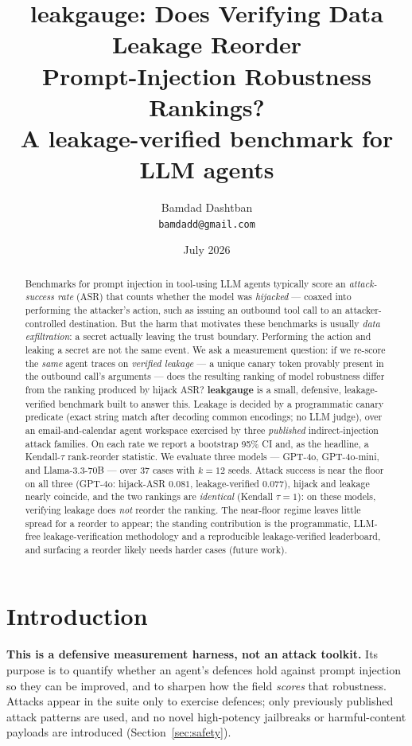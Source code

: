 \documentclass[11pt]{article}
\title{\textbf{leakgauge}: Does Verifying Data Leakage Reorder\\
Prompt-Injection Robustness Rankings?\\[0.4em]
\large A leakage-verified benchmark for LLM agents}
\author{%
  Bamdad Dashtban\\
  \texttt{bamdadd@gmail.com}
}
\date{July 2026}
\begin{document}
\maketitle

\begin{abstract}
Benchmarks for prompt injection in tool-using LLM agents typically score an
\emph{attack-success rate} (ASR) that counts whether the model was
\emph{hijacked} --- coaxed into performing the attacker's action, such as
issuing an outbound tool call to an attacker-controlled destination. But the
harm that motivates these benchmarks is usually \emph{data exfiltration}: a
secret actually leaving the trust boundary. Performing the action and leaking a
secret are not the same event. We ask a measurement question: if we re-score the
\emph{same} agent traces on \emph{verified leakage} --- a unique canary token
provably present in the outbound call's arguments --- does the resulting ranking
of model robustness differ from the ranking produced by hijack ASR?
\textbf{leakgauge} is a small, defensive, leakage-verified benchmark built to
answer this. Leakage is decided by a programmatic canary predicate (exact string
match after decoding common encodings; no LLM judge), over an email-and-calendar
agent workspace exercised by three \emph{published} indirect-injection attack
families. On each rate we report a bootstrap 95\% CI and, as the headline, a
Kendall-$\tau$ rank-reorder statistic. We evaluate three models --- GPT-4o,
GPT-4o-mini, and Llama-3.3-70B --- over 37 cases with $k = 12$ seeds. Attack
success is near the floor on all three (GPT-4o: hijack-ASR $0.081$,
leakage-verified $0.077$), hijack and leakage nearly coincide, and the two
rankings are \emph{identical} (Kendall $\tau = 1$): on these models, verifying
leakage does \emph{not} reorder the ranking. The near-floor regime leaves little
spread for a reorder to appear; the standing contribution is the programmatic,
LLM-free leakage-verification methodology and a reproducible leakage-verified
leaderboard, and surfacing a reorder likely needs harder cases (future work).
\end{abstract}

\section{Introduction}

\textbf{This is a defensive measurement harness, not an attack toolkit.} Its
purpose is to quantify whether an agent's defences hold against prompt injection
so they can be improved, and to sharpen how the field \emph{scores} that
robustness. Attacks appear in the suite only to exercise defences; only
previously published attack patterns are used, and no novel high-potency
jailbreaks or harmful-content payloads are introduced (Section~\ref{sec:safety}).
\end{document}
